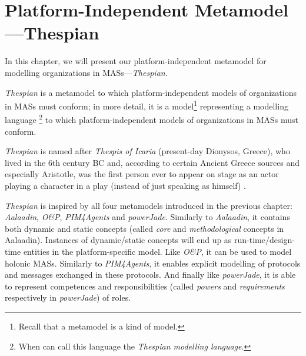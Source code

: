 
\chapter{Platform-Independent Metamodel---Thespian}

In this chapter, we will present our platform-independent metamodel for modelling organizations in MASs---\textit{Thespian}.

\textit{Thespian} is a metamodel to which platform-independent models of organizations in MASs must conform; in more detail, it is a model\footnote{Recall that a metamodel is a kind of model.} representing a modelling language \footnote{When can call this language the \textit{Thespian modelling language}.} to which platform-independent models of organizations in MASs must conform.

\textit{Thespian} is named after \textit{Thespis of Icaria} (present-day Dionysos, Greece), who lived in the 6th century BC and, according to certain Ancient Greece sources and especially Aristotle, was the first person ever to appear on stage as an actor playing a character in a play (instead of just speaking as himself) \cite{Wikipedia-Thespis}.

\textit{Thespian} is inspired by all four metamodels introduced in the previous chapter: \textit{Aalaadin}, \textit{O\&P}, \textit{PIM4Agents} and \textit{powerJade}.
Similarly to \textit{Aalaadin}, it contains both dynamic and static concepts (called \textit{core} and \textit{methodological} concepts in Aalaadin).
Instances of dynamic/static concepts will end up as run-time/design-time entities in the platform-specific model.
Like \textit{O\&P}, it can be used to model holonic MASs.
Similarly to \textit{PIM4Agents}, it enables explicit modelling of protocols and messages exchanged in these protocols.
And finally like \textit{powerJade}, it is able to represent competences and responsibilities (called \textit{powers} and \textit{requirements} respectively in \textit{powerJade}) of roles.

